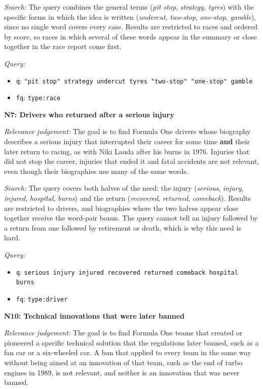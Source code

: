 \documentclass[sigconf]{acmart}
\newcommand{\needheading}[1]{\par\medskip\noindent\textbf{#1}\par\nopagebreak\smallskip}
\begin{document}
\textit{Search:} The query combines the general terms (\textit{pit stop},
\textit{strategy}, \textit{tyres}) with the specific forms in which the idea
is written (\textit{undercut}, \textit{two-stop}, \textit{one-stop},
\textit{gamble}), since no single word covers every case. Results are
restricted to races and ordered by score, so races in which several of these
words appear in the summary or close together in the race report come
first.

\textit{Query:}
\begin{itemize}
  \item \texttt{q}: \texttt{"pit stop" strategy undercut tyres "two-stop" "one-stop" gamble}
  \item \texttt{fq}: \texttt{type:race}
\end{itemize}

\needheading{N7: Drivers who returned after a serious injury}
\textit{Relevance judgement:} The goal is to find Formula One drivers whose biography describes a
serious injury that interrupted their career for some time \textbf{and}
their later return to racing, as with Niki Lauda after his burns in 1976.
Injuries that did not stop the career, injuries that ended it and fatal
accidents are not relevant, even though their biographies use many of the
same words.

\textit{Search:} The query covers both halves of the need: the injury
(\textit{serious}, \textit{injury}, \textit{injured}, \textit{hospital},
\textit{burns}) and the return (\textit{recovered}, \textit{returned},
\textit{comeback}). Results are restricted to drivers, and biographies where
the two halves appear close together receive the word-pair bonus. The query
cannot tell an injury followed by a return from one followed by retirement
or death, which is why this need is hard.

\textit{Query:}
\begin{itemize}
  \item \texttt{q}: \texttt{serious injury injured recovered returned comeback hospital burns}
  \item \texttt{fq}: \texttt{type:driver}
\end{itemize}

\needheading{N10: Technical innovations that were later banned}
\textit{Relevance judgement:} The goal is to find Formula One teams that created or pioneered a
specific technical solution that the regulations later banned, such as a fan
car or a six-wheeled car. A ban that applied to every team in the same way
without being aimed at an innovation of that team, such as the end of turbo
engines in 1989, is not relevant, and neither is an innovation that was
never banned.
\end{document}
